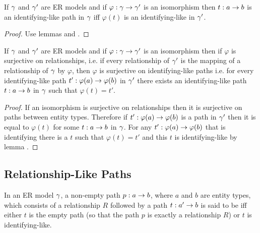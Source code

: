 \begin{lemma}
If $\gamma$ and $\gamma'$ are ER models and if $\varphi:\gamma \rightarrow \gamma'$ is an isomorphism then $t: a  \rightarrow  b$ is an identifying-like path in $\gamma$ iff $\varphi(t)$ is an identifying-like in $\gamma'$.
\end{lemma}
\begin{proof}
Use lemmas  and .
\end{proof}

\begin{lemma}
If $\gamma$ and $\gamma'$ are ER models and if $\varphi:\gamma \rightarrow \gamma'$ is an isomorphism then if $\varphi$ is 
surjective on relationships, i.e. if every relationship of $\gamma'$ is the mapping of a relationship of $\gamma$ by  $\varphi$,
then $\varphi$ is surjective on identifying-like paths i.e. for every identifying-like path $t': \varphi(a) \rightarrow \varphi(b)$
in $\gamma'$ there exists an identifying-like path $t: a \rightarrow b$ in $\gamma$ such that $\varphi(t)=t'$. 
\end{lemma}
\begin{proof}
If an isomorphism is surjective on relationships then it is surjective on paths between entity types.
Therefore if $t':\varphi(a) \rightarrow \varphi(b)$ is a path in $\gamma'$ then it is equal to $\varphi(t)$ for some
$t: a \rightarrow b$ in $\gamma$. For any $t':\varphi(a) \rightarrow \varphi(b)$ that is identifying there is a $t$ such that 
$\varphi(t)=t'$ and this $t$ is identifying-like by lemma .  
\end{proof}
\subsection{Relationship-Like Paths}
\begin{definition}
In an ER model $\gamma$, a non-empty path $p: a \rightarrow b$, where $a$ and $b$ are entity types, which consists
of a relationship $R$ followed by a  path $t :a' \rightarrow b$ is said to be  iff
either  $t$ is the empty path (so that the path $p$ is exactly a relationship $R$) or $t$
is identifying-like.
\end{definition}

